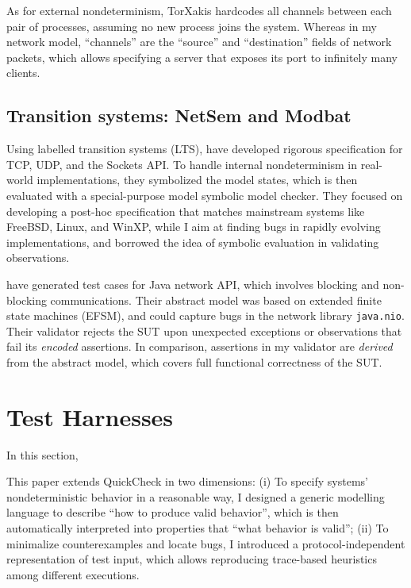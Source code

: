 As for external nondeterminism, TorXakis hardcodes all channels between each
pair of processes, assuming no new process joins the system.  Whereas in my
network model, ``channels'' are the ``source'' and ``destination'' fields of
network packets, which allows specifying a server that exposes its port to
infinitely many clients.

\subsection{Transition systems: NetSem and Modbat}
Using labelled transition systems (LTS), \citet{netsem} have developed rigorous
specification for TCP, UDP, and the Sockets API.  To handle internal
nondeterminism in real-world implementations, they symbolized the model states,
which is then evaluated with a special-purpose model symbolic model checker.
They focused on developing a post-hoc specification that matches mainstream
systems like FreeBSD, Linux, and WinXP, while I aim at finding bugs in rapidly
evolving implementations, and borrowed the idea of symbolic evaluation in
validating observations.

\citet{modbat} have generated test cases for Java network API, which involves
blocking and non-blocking communications.  Their abstract model was based on
extended finite state machines (EFSM), and could capture bugs in the network
library \verb|java.nio|.  Their validator rejects the SUT upon unexpected
exceptions or observations that fail its {\em encoded} assertions.  In
comparison, assertions in my validator are {\em derived} from the abstract
model, which covers full functional correctness of the SUT.

\section{Test Harnesses}
\label{sec:related-harness}
In this section,

This paper extends QuickCheck in two dimensions:
(i) To specify systems' nondeterministic behavior in a reasonable way, I
designed a generic modelling language to describe ``how to produce valid
behavior'', which is then automatically interpreted into properties that ``what
behavior is valid''; (ii) To minimalize counterexamples and locate bugs, I
introduced a protocol-independent representation of test input, which allows
reproducing trace-based heuristics among different executions.
